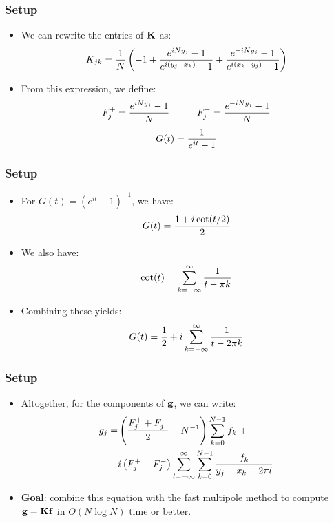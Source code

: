 \documentclass{beamer}
\newcommand{\parens}[1]{\left(#1\right)}
\begin{document}
\begin{frame}
  \frametitle{Setup}
  \begin{itemize}
  \item We can rewrite the entries of $\bold{K}$ as:
    \begin{align*}
      K_{jk} = {1 \over N} \parens{-1 + {e^{iNy_j} - 1 \over e^{i(y_j - x_k)} - 1} + {e^{-iNy_j} - 1 \over e^{i(x_k - y_j)} - 1}}
    \end{align*}
    \pause
  \item From this expression, we define:
    \begin{align*}
      F_j^+ = {e^{iNy_j} - 1 \over N} \hspace{1cm} F_j^- = {e^{-iNy_j} - 1 \over N}
    \end{align*}
    \begin{align*}
      G(t) = {1 \over e^{it} - 1}
    \end{align*}
  \end{itemize}
\end{frame}

\begin{frame}
  \frametitle{Setup}
  \begin{itemize}
  \item For $G(t) = (e^{it} - 1)^{-1}$, we have:
    \begin{align*}
      G(t) = {1 + i \cot(t/2) \over 2}
    \end{align*}
  \item We also have:
    \begin{align*}
      \cot(t) = \sum_{k=-\infty}^\infty {1 \over t - \pi k}
    \end{align*}
    \pause
  \item Combining these yields:
    \begin{align*}
      G(t) = {1 \over 2} + i \sum_{k=-\infty}^\infty {1 \over t - 2\pi k}
    \end{align*}
  \end{itemize}
\end{frame}

\begin{frame}
  \frametitle{Setup}
  \begin{itemize}
  \item Altogether, for the components of $\bold{g}$, we can write:
    \begin{align*}
      g_j = &\parens{{F_j^+ + F_j^- \over 2} - N^{-1}} \sum_{k=0}^{N-1} f_k \; + \\ &i \parens{F_j^+ - F_j^-} \sum_{l=-\infty}^\infty \sum_{k=0}^{N-1} {f_k \over y_j - x_k - 2\pi l}
    \end{align*}
    \pause
  \item \textbf{Goal}: combine this equation with the fast multipole
    method to compute $\bold{g} = \bold{K} \bold{f}$
    in $O(N \log N)$ time or better.
  \end{itemize}
\end{frame}
\end{document}
